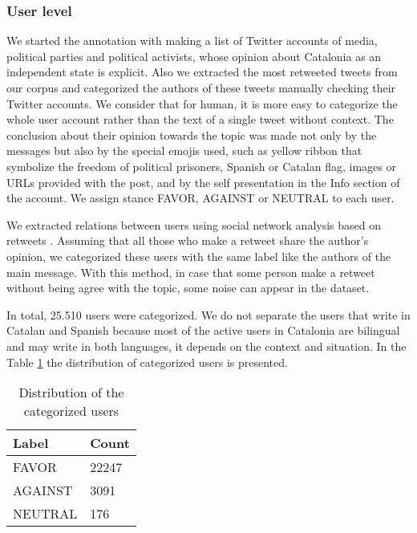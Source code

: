 \documentclass[10pt, a4paper]{article}
\begin{document}
\subsubsection{User level}

We started the annotation with making a list of Twitter accounts of media, political parties and political activists, whose opinion about Catalonia as an independent state is explicit. Also we extracted the most retweeted tweets from our corpus and categorized the authors of these tweets manually checking their Twitter accounts. We consider that for human, it is more easy to categorize the whole user account rather than the text of a single tweet without context. The conclusion about their opinion towards the topic was made not only by the messages but also  by  the special emojis used, such as yellow ribbon that symbolize the freedom of political prisoners, Spanish or Catalan flag, images or URLs provided  with the post, and by the self presentation in the Info section of the account. We assign stance FAVOR, AGAINST or NEUTRAL to each user.  

We extracted relations between users using social network analysis based on retweets \cite{SNA2002}. Assuming that all those who make a retweet share the author's opinion, we categorized these users with the same label like the authors of the main message. With this method, in case that some person make a retweet without being agree with the topic, some noise can appear in the dataset.  

In total, 25.510 users were categorized. We do not separate the users that write in Catalan and Spanish because most of the  active users in Catalonia are bilingual and may write in both languages, it depends on the context and situation. In the Table \ref{table:users} the distribution of categorized users is presented. 

\begin{table}[!h]
\begin{center}
\begin{tabularx}{\columnwidth}{|l|X|}

      \hline
      Label&Count\\
      \hline
      FAVOR & 22247 \\
      \hline
      AGAINST & 3091\\
      \hline
     NEUTRAL & 176\\
      \hline

\end{tabularx}
\caption{Distribution of the categorized users}
\label{table:users}
 \end{center}
\end{table}
\end{document}
